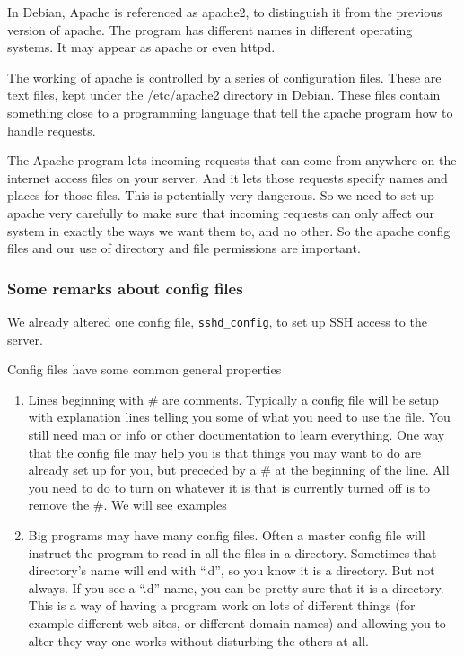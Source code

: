 \documentclass[12pt, a4paper]{article}
\begin{document}
In Debian, Apache is referenced as apache2, to distinguish it from the previous version of apache. The program has different names in different operating systems. It may appear as apache or even httpd.

The working of apache is controlled by a series of configuration files. These are text files, kept under the /etc/apache2 directory in Debian. These files contain something close to a programming language that tell the apache program how to handle requests.

The Apache program lets incoming requests that can come from anywhere on the internet access files on your server. And it lets those requests specify names and places for those files. This is potentially very dangerous. So we need to set up apache very carefully to make sure that incoming requests can only affect our system in exactly the ways we want them to, and no other. So the apache config files and our use of directory and file permissions are important.

\subsubsection*{Some remarks about config files} 
We already altered one config file, \verb|sshd_config|, to set up SSH access to the server. 

Config files have some common general properties
\begin{enumerate}
 \item Lines beginning with \# are comments. Typically a config file will be setup with explanation lines telling you some of what you need to use the file. You still need man or info or other documentation to learn everything. One way that the config file may help you is that things you may want to do are already set up for you, but preceded by a \# at the beginning of the line. All you need to do to turn on whatever it is that is currently turned off is to remove the \#. We will see examples
 \item Big programs may have many config files. Often a master config file will instruct the program to read in all the files in a directory. Sometimes that directory’s name will end with “.d”, so you know it is a directory. But not always. If you see a “.d” name, you can be pretty sure that it is a directory. This is a way of having a program work on lots of different things (for example different web sites, or different domain names) and allowing you to alter they way one works without disturbing the others at all.    
\end{enumerate}
\end{document}

